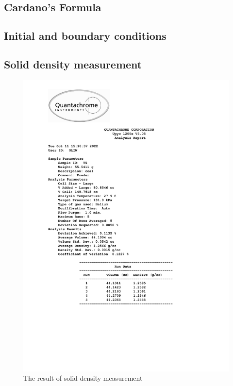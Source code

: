 \documentclass[a4paper,fleqn]{cas-dc}
\begin{document}
\subsection{Cardano's Formula} \label{CH: Cardano}


\subsection{Initial and boundary conditions} \label{CH: IC_BC}


%

\subsection{Solid density measurement} \label{CH: Solid_Density_Measurment}

\begin{figure}[!h]
	\centering 
	\includegraphics[trim=2cm 6cm 4cm 0cm, clip,width=\columnwidth]{Sections/ultraReportT5.pdf}
	\caption{The result of solid density measurement}
\end{figure}
\end{document}
